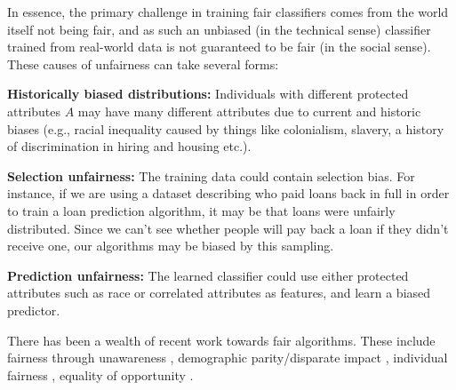 In essence, the primary challenge in training fair classifiers comes
from the world itself  not being fair, and as such an
unbiased (in the technical sense) classifier trained from real-world
data is not guaranteed to be fair (in the social sense). These causes
of unfairness can take several forms:
\vspace{-2.5ex}
\begin{description}
\item {\bf Historically biased distributions:} Individuals with different protected attributes $A$  may have many different attributes due to current and historic biases (e.g., racial inequality caused by things like colonialism,
slavery, a history of discrimination in hiring and
housing etc.). %

\item {\bf Selection unfairness:} The training data could contain selection bias. For instance, if we are using a dataset describing who paid loans back in full in order to train a loan prediction algorithm, it may be that loans were unfairly distributed. Since we can't see whether people will pay back a loan if they didn't receive one, our algorithms may be biased by this sampling.
\item {\bf Prediction unfairness:} The learned classifier could use either protected attributes such as race or correlated attributes as features, and  learn a biased predictor.
\end{description}
There has been a wealth of recent work towards fair
algorithms. %
These include fairness through unawareness \cite{grgiccase,zafar2016fairness}, demographic
parity/disparate impact \cite{zafar2015learning}, individual fairness
\cite{dwork2012fairness,zemel2013learning,louizos2015variational,joseph2016rawlsian},
equality of opportunity \cite{hardt2016equality,zafar2016fairness}.


